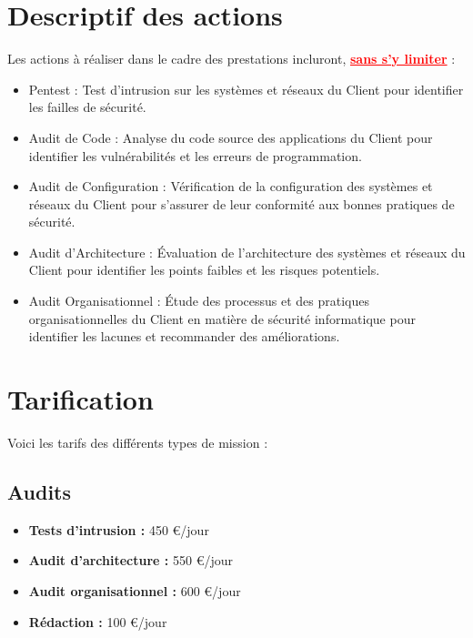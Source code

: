 \documentclass[12pt]{extarticle}
\begin{document}
\section{Descriptif des actions}
Les actions à réaliser dans le cadre des prestations incluront, \textcolor{red}{\textbf{\underline{sans s'y limiter}}} :
\begin{itemize}
    \item Pentest : Test d'intrusion sur les systèmes et réseaux du Client pour identifier les failles de sécurité.
    \item Audit de Code : Analyse du code source des applications du Client pour identifier les vulnérabilités et les erreurs de programmation.
    \item Audit de Configuration : Vérification de la configuration des systèmes et réseaux du Client pour s'assurer de leur conformité aux bonnes pratiques de sécurité.
    \item Audit d'Architecture : Évaluation de l'architecture des systèmes et réseaux du Client pour identifier les points faibles et les risques potentiels.
    \item Audit Organisationnel : Étude des processus et des pratiques organisationnelles du Client en matière de sécurité informatique pour identifier les lacunes et recommander des améliorations.
\end{itemize}
\newpage

\section{Tarification}
Voici les tarifs des différents types de mission :
\subsection{Audits}
\begin{itemize}
    \item \textbf{Tests d'intrusion :} 450 €/jour
    \item \textbf{Audit d'architecture :} 550 €/jour
    \item \textbf{Audit organisationnel :} 600 €/jour
    \item \textbf{Rédaction :} 100 €/jour
\end{itemize}
\end{document}
